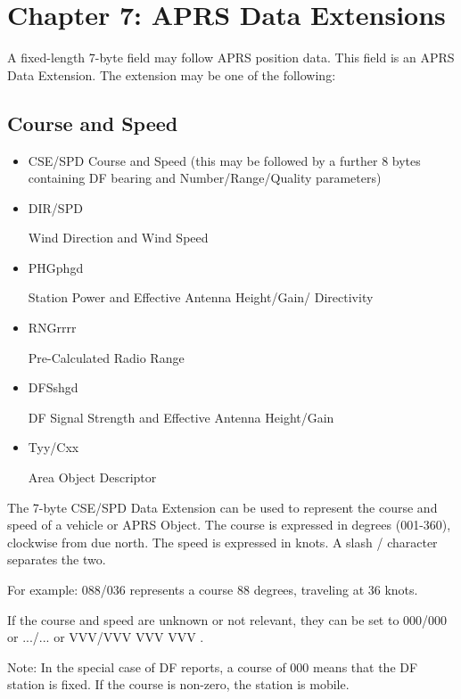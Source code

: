 
\chapter{Chapter 7: APRS Data Extensions}


A fixed-length 7-byte field may follow APRS position data. This field is an
APRS Data Extension. The extension may be one of the following:

\section{Course and Speed}


\begin{itemize}
\item CSE/SPD
Course and Speed (this may be followed by a further 8 bytes
containing DF bearing and Number/Range/Quality
parameters)

\item DIR/SPD

Wind Direction and Wind Speed

\item PHGphgd

Station Power and Effective Antenna Height/Gain/
Directivity

\item RNGrrrr

Pre-Calculated Radio Range

\item DFSshgd

DF Signal Strength and Effective Antenna Height/Gain

\item Tyy/Cxx

Area Object Descriptor

\end{itemize}


The 7-byte CSE/SPD Data Extension can be used to represent the course and
speed of a vehicle or APRS Object.
The course is expressed in degrees (001-360), clockwise from due north. The
speed is expressed in knots. A slash / character separates the two.

For example:
088/036 represents a course 88 degrees, traveling at 36 knots.

If the course and speed are unknown or not relevant, they can be set to
000/000 or .../... or VVV/VVV
VVV VVV .

Note: In the special case of DF reports, a course of 000 means that the DF
station is fixed. If the course is non-zero, the station is mobile.

